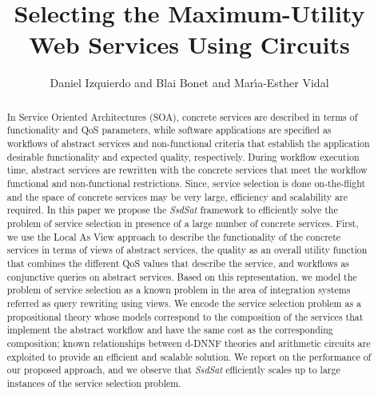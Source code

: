 \documentclass{llncs}
\begin{document}
\allowdisplaybreaks
\title{Selecting the Maximum-Utility  Web Services  Using Circuits}
\author{Daniel Izquierdo   and Blai Bonet   and Mar\'{\i}a-Esther Vidal }

 \maketitle
\begin{abstract}
In Service Oriented Architectures (SOA), concrete services are described in terms of functionality   and QoS parameters, while software applications are specified as workflows of abstract services and non-functional criteria that establish the  application desirable functionality and  expected quality, respectively.  During workflow execution time,  abstract services  are rewritten 
with the concrete services  that meet the workflow  functional and non-functional restrictions. Since, service selection is done on-the-flight and the space of concrete services may be very large, efficiency and scalability are required.  In this paper we propose the {\it SsdSat} framework to efficiently solve the problem of service selection in presence of a large number of concrete services.
First, we use the Local As View approach to describe the functionality  of the concrete services in terms of views of abstract services, the quality as an overall utility function that combines the different QoS values that describe the service, and  workflows as  conjunctive queries on abstract services. Based on this representation, we 
model the problem of service selection as a known problem in the area of integration systems referred as query rewriting using views.  We encode the service selection problem as a propositional theory whose models correspond to the composition of the services that implement the abstract workflow and have the same cost as the corresponding composition; known relationships between d-DNNF theories and arithmetic circuits are exploited to provide an efficient and scalable solution.  We report on the performance of our proposed approach, and we observe that  {\it SsdSat}  efficiently scales up to large instances of the service selection problem.  
 
 
\end{abstract}                
\end{document}
